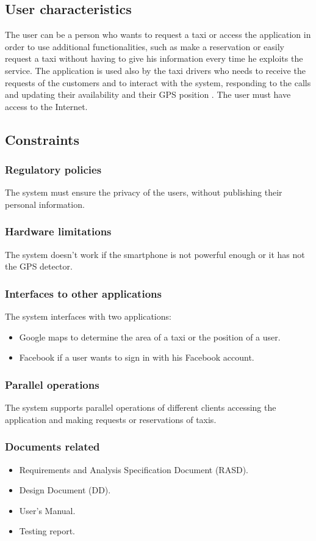 \documentclass[18pt,oneside,a4paper, titlepage]{article}
\begin{document}
	\subsection{User characteristics}
	The user can be a person who wants to request a taxi or access the application in order to use additional functionalities, such as make a reservation or easily request a taxi without having to give his information every time he exploits the service.
	The application is used also by the taxi drivers who needs to receive the requests of the customers and to interact with the system, responding to the calls and updating their availability and their GPS position .
	The user must have access to the Internet.
	
	\subsection{Constraints}
		\subsubsection{Regulatory policies}
		The system must ensure the privacy of the users, without publishing their personal information. 
		\subsubsection{Hardware limitations}
		The system doesn't work if the smartphone is not powerful enough or it has not the GPS detector.
		\subsubsection{Interfaces to other applications}
		The system interfaces with two applications:
		\begin{itemize}
			\item Google maps to determine the area of a taxi or the position of a user.
			\item Facebook if a user wants to sign in with his Facebook account.
		\end{itemize}
		\subsubsection{Parallel operations}
			The system supports parallel operations of different clients accessing the application and making requests or reservations of taxis.
		
		\subsubsection{Documents related}
			\begin{itemize}
				\item Requirements and Analysis Specification Document (RASD).
				\item Design Document (DD).
				\item User's Manual.
				\item Testing report.
			\end{itemize}
		
\end{document}
